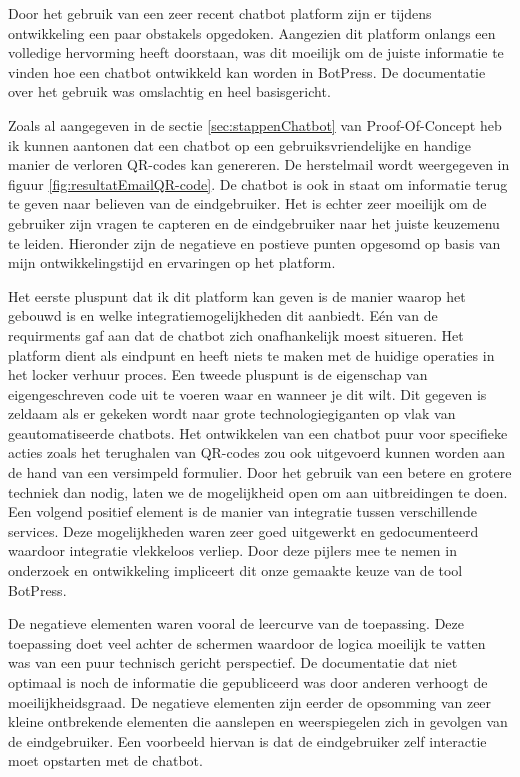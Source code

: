 Door het gebruik van een zeer recent chatbot platform zijn er tijdens ontwikkeling een paar obstakels opgedoken. Aangezien dit platform onlangs een volledige hervorming heeft doorstaan, was dit moeilijk om de juiste informatie te vinden hoe een chatbot ontwikkeld kan worden in BotPress. De documentatie over het gebruik was omslachtig en heel basisgericht. 

Zoals al aangegeven in de sectie \ref{sec:stappenChatbot} van Proof-Of-Concept heb ik kunnen aantonen dat een chatbot op een gebruiksvriendelijke en handige manier de verloren QR-codes kan genereren. De herstelmail wordt weergegeven in figuur \ref{fig:resultatEmailQR-code}. De chatbot is ook in staat om informatie terug te geven naar believen van de eindgebruiker. Het is echter zeer moeilijk om de gebruiker zijn vragen te capteren en de eindgebruiker naar het juiste keuzemenu te leiden. Hieronder zijn de negatieve en postieve punten opgesomd op basis van mijn ontwikkelingstijd en ervaringen op het platform.

Het eerste pluspunt dat ik dit platform kan geven is de manier waarop het gebouwd is en welke integratiemogelijkheden dit aanbiedt. Eén van de requirments gaf aan dat de chatbot zich onafhankelijk moest situeren. Het platform dient als eindpunt en heeft niets te maken met de huidige operaties in het locker verhuur proces. Een tweede pluspunt is de eigenschap van eigengeschreven code uit te voeren waar en wanneer je dit wilt. Dit gegeven is zeldaam als er gekeken wordt naar grote technologiegiganten op vlak van geautomatiseerde chatbots. 
Het ontwikkelen van een chatbot puur voor specifieke acties zoals het terughalen van QR-codes zou ook uitgevoerd kunnen worden aan de hand van een versimpeld formulier. Door het gebruik van een betere en grotere techniek dan nodig, laten we de mogelijkheid open om aan uitbreidingen te doen. Een volgend positief element is de manier van integratie tussen verschillende services. Deze mogelijkheden waren zeer goed uitgewerkt en gedocumenteerd waardoor integratie vlekkeloos verliep. Door deze pijlers mee te nemen in onderzoek en ontwikkeling impliceert dit onze gemaakte keuze van de tool BotPress.

De negatieve elementen waren vooral de leercurve van de toepassing. Deze toepassing doet veel achter de schermen waardoor de logica moeilijk te vatten was van een puur technisch gericht perspectief. De documentatie dat niet optimaal is noch de informatie die gepubliceerd was door anderen verhoogt de moeilijkheidsgraad. De negatieve elementen zijn eerder de opsomming van zeer kleine ontbrekende elementen die aanslepen en weerspiegelen zich in gevolgen van de eindgebruiker. Een voorbeeld hiervan is dat de eindgebruiker zelf interactie moet opstarten met de chatbot.

